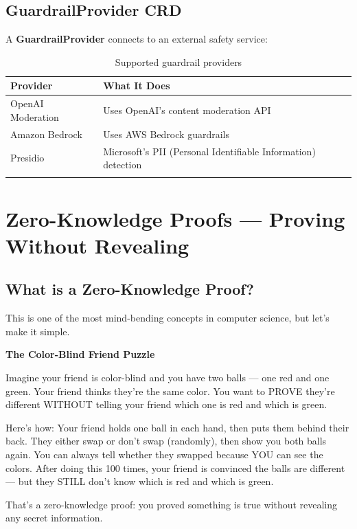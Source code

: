 \documentclass[12pt,a4paper,openany]{report}
\begin{document}
\section{GuardrailProvider CRD}

A \textbf{GuardrailProvider} connects to an external safety service:

\begin{longtable}{p{4cm}p{9cm}}
\toprule
\textbf{Provider} & \textbf{What It Does} \\
\midrule
OpenAI Moderation & Uses OpenAI's content moderation API \\
Amazon Bedrock & Uses AWS Bedrock guardrails \\
Presidio & Microsoft's PII (Personal Identifiable Information) detection \\
\bottomrule
\caption{Supported guardrail providers}
\end{longtable}


\chapter{Zero-Knowledge Proofs — Proving Without Revealing}

\section{What is a Zero-Knowledge Proof?}

This is one of the most mind-bending concepts in computer science, but let's make it simple.

\begin{analogybox}
\textbf{The Color-Blind Friend Puzzle}

Imagine your friend is color-blind and you have two balls — one red and one green. Your friend thinks they're the same color. You want to PROVE they're different WITHOUT telling your friend which one is red and which is green.

Here's how: Your friend holds one ball in each hand, then puts them behind their back. They either swap or don't swap (randomly), then show you both balls again. You can always tell whether they swapped because YOU can see the colors. After doing this 100 times, your friend is convinced the balls are different — but they STILL don't know which is red and which is green.

That's a zero-knowledge proof: you proved something is true without revealing any secret information.
\end{analogybox}
\end{document}
